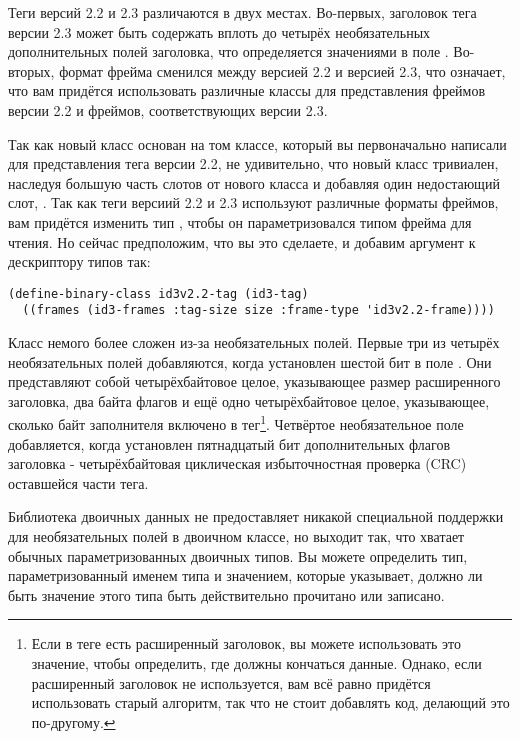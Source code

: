 Теги версий 2.2 и 2.3 различаются в двух местах. Во-первых, заголовок тега версии 2.3
может быть содержать вплоть до четырёх необязательных дополнительных полей заголовка, что
определяется значениями в поле . Во-вторых, формат фрейма сменился между
версией 2.2 и версией 2.3, что означает, что вам придётся использовать различные классы
для представления фреймов версии 2.2 и фреймов, соответствующих версии 2.3.

Так как новый класс  основан на том классе, который вы первоначально
написали для представления тега версии 2.2, не удивительно, что новый класс
 тривиален, наследуя большую часть слотов от нового класса
 и добавляя один недостающий слот, . Так как теги версиий 2.2 и
2.3 используют различные форматы фреймов, вам придётся изменить тип ,
чтобы он параметризовался типом фрейма для чтения. Но сейчас предположим, что вы это
сделаете, и добавим аргумент  к дескриптору типов  так:

\begin{lstlisting}
(define-binary-class id3v2.2-tag (id3-tag)
  ((frames (id3-frames :tag-size size :frame-type 'id3v2.2-frame))))
\end{lstlisting}

Класс  немого более сложен из-за необязательных полей. Первые три из
четырёх необязательных полей добавляются, когда установлен шестой бит в поле
. Они представляют собой четырёхбайтовое целое, указывающее размер
расширенного заголовка, два байта флагов и ещё одно четырёхбайтовое целое, указывающее,
сколько байт заполнителя включено в тег\footnote{Если в теге есть расширенный заголовок,
  вы можете использовать это значение, чтобы определить, где должны кончаться
  данные. Однако, если расширенный заголовок не используется, вам всё равно придётся
  использовать старый алгоритм, так что не стоит добавлять код, делающий это
  по-другому.}. Четвёртое необязательное поле добавляется, когда установлен пятнадцатый
бит дополнительных флагов заголовка - четырёхбайтовая циклическая избыточностная проверка
(CRC) оставшейся части тега.

Библиотека двоичных данных не предоставляет никакой специальной поддержки для
необязательных полей в двоичном классе, но выходит так, что хватает обычных
параметризованных двоичных типов. Вы можете определить тип, параметризованный именем типа
и значением, которые указывает, должно ли быть значение этого типа быть действительно
прочитано или записано.

